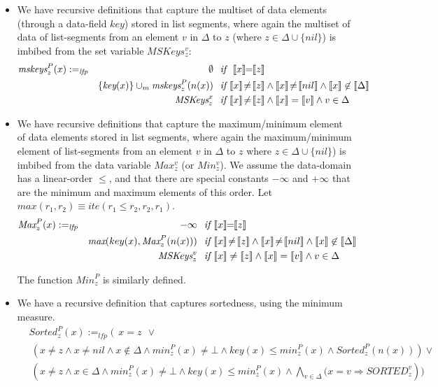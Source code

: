 \begin{definition}
\begin{itemize}
    \item We have recursive definitions that capture the multiset of data elements (through a data-field
    $\textit{key}$) stored in list segments, 
    where again the multiset of data 
of list-segments from an element $v$ in $\Delta$ to $z$ (where $z \in \Delta \cup \{nil\}$) is imbibed from the set variable $MSKeys_z^v$:
\begin{align*}
\textit{mskeys}_z^P(x) & :=_{\textit{lfp}} & \emptyset & \textit{~~if~} \ \sem{x}\!\!=\!\!\sem{z} \\
& & \{\textit{key}(x)\} \cup_m \textit{mskeys}_z^P(n(x)) & \textit{~~if~} \sem{x} \!\not =\! \sem{z} \wedge \sem{x} \!\not =\! \sem{nil} \wedge \sem{x} \not \in \sem{\Delta} \\
& & \textit{MSKeys}_z^x & \textit{~~if~} \sem{x} \!\not =\! \sem{z} \wedge \sem{x}=\sem{v} \wedge v \in \Delta 
\end{align*}

    \item We have recursive definitions that capture the maximum/minimum element of data elements stored in list segments, where again the maximum/minimum element  
of list-segments from an element $v$ in $\Delta$ to $z$ where $z \in \Delta \cup \{nil\}$) is imbibed from the data variable $Max_z^v$ (or $Min_z^v$).
We assume the data-domain has a linear-order $\leq$, and that there are special constants $-\infty$ and $+\infty$
that are the minimum and maximum elements of this order. Let $max(r_1,r_2) \equiv \textit{ite}(r_1 \leq r_2, r_2, r_1)$.
\begin{align*}
\textit{Max}_z^P(x) & :=_{\textit{lfp}} & -\infty & \textit{~~if~} \sem{x}\!\!=\!\!\sem{z} \\
& & \textit{max}(key(x), \textit{Max}_z^P(n(x))) & \textit{~~if~} \sem{x} \!\not =\! \sem{z} \wedge \sem{x} \!\not=\! \sem{nil} \wedge \sem{x} \not \in \sem{\Delta} \\
& & \textit{MSKeys}_z^v & \textit{~~if~} \sem{x} \not = \sem{z} \wedge \sem{x} = \sem{v} \wedge v \in \Delta 
\end{align*}

 The function $\textit{Min}_z^P$ is similarly defined.
 
    \item We have a recursive definition that captures sortedness, using the minimum measure.
\begin{align*}
	&\textit{Sorted}_z^P(x) \!\!:=_{\textit{lfp}}\!\! \Big( ~~x\!\!=\!\textit{z} ~~\vee  \\
	&~\left( x \!\not =\! z \wedge x \!\not=\! nil \wedge x \not \in \Delta \wedge \textit{min}_z^P(x) \!\not =\! \bot \wedge \textit{key}(x) \leq \textit{min}_z^P(x) \wedge \textit{Sorted}_z^P(n(x))\right) \vee\\
&	~
\left(x \!\not =\! z \wedge x \in \Delta \wedge \textit{min}_z^P(x) \!\not =\! \bot \wedge \textit{key}(x) \leq \textit{min}_z^P(x) \wedge \bigwedge_{v \in \Delta} (x=v \Rightarrow \textit{SORTED}_z^v\right)\Big)
\end{align*}


\end{itemize}
\end{definition}
